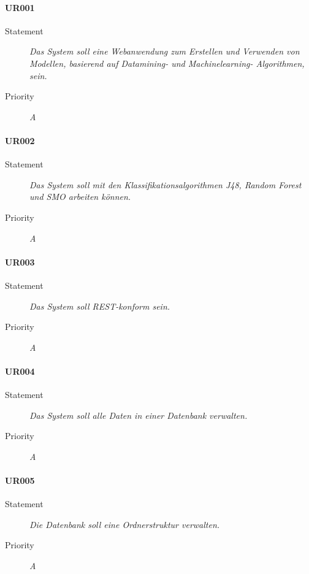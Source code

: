 \paragraph{UR001}
\begin{description}
\item [Statement] \textit{Das System soll eine Webanwendung zum Erstellen und Verwenden von Modellen, basierend auf Datamining- und Machinelearning- Algorithmen, sein.}
\item [Priority] \textit{A}
\end{description}

\paragraph{UR002}
\begin{description}
\item[Statement] \textit{Das System soll mit den Klassifikationsalgorithmen J48, Random Forest und SMO arbeiten können.}
\item[Priority] \textit{A}
\end{description}

\paragraph{UR003}
\begin{description}
\item[Statement] \textit{Das System soll \gls{REST}-konform sein.}
\item[Priority] \textit{A}
\end{description}

\paragraph{UR004}
\begin{description}
\item[Statement] \textit{Das System soll alle Daten in einer Datenbank verwalten.}
\item[Priority] \textit{A}
\end{description}

\paragraph{UR005}
\begin{description}
\item[Statement] \textit{Die Datenbank soll eine Ordnerstruktur verwalten.}
\item[Priority] \textit{A}
\end{description}

